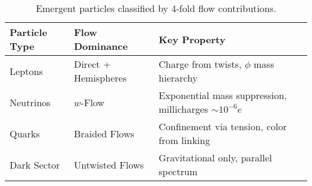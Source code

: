 \begin{table}[h]
\centering
\begin{tabular}{|l|l|l|}
\hline
Particle Type & Flow Dominance & Key Property \\
\hline
Leptons & Direct + Hemispheres & Charge from twists, $\phi$ mass hierarchy \\
Neutrinos & $w$-Flow & Exponential mass suppression, millicharges $\sim 10^{-6} e$ \\
Quarks & Braided Flows & Confinement via tension, color from linking \\
Dark Sector & Untwisted Flows & Gravitational only, parallel spectrum \\
\hline
\end{tabular}
\caption{Emergent particles classified by 4-fold flow contributions.}
\label{tab:particles}
\end{table}

\medskip
\noindent
{}
\medskip
